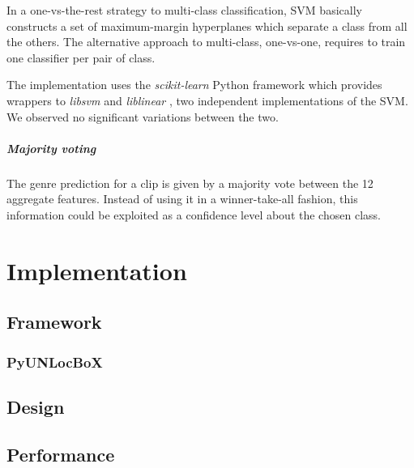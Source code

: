 In a one-vs-the-rest strategy to multi-class classification, \gls{SVM} basically constructs a set of maximum-margin hyperplanes which separate a class from all the others. The alternative approach to multi-class, one-vs-one, requires to train one classifier per pair of class.

The implementation uses the \textit{scikit-learn} Python framework \cite{sklearn} which provides wrappers to \textit{libsvm} \cite{libsvm} and \textit{liblinear} \cite{liblinear}, two independent implementations of the \gls{SVM}. We observed no significant variations between the two.

\paragraph{Majority voting}
The genre prediction for a clip is given by a majority vote between the 12 aggregate features. Instead of using it in a winner-take-all fashion, this information could be exploited as a confidence level about the chosen class.




\chapter{Implementation} \label{chap:implementation}

\section{Framework}

\subsection{PyUNLocBoX}

\section{Design}

\section{Performance} \label{sec:performance}

